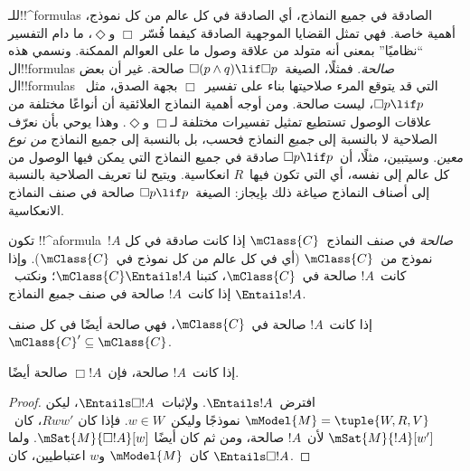 \documentclass[../../../include/open-logic-section]{subfiles}
\begin{document}


\begin{explain}
  للـ!!^{formula}s الصادقة في جميع النماذج، أي الصادقة في كل عالم من
  كل نموذج، أهمية خاصة. فهي تمثل القضايا الموجهية الصادقة كيفما فُسّر
  $\Box$ و$\Diamond$، ما دام التفسير ``نظاميًا'' بمعنى أنه متولد من
  علاقة وصول ما على العوالم الممكنة. ونسمي هذه ال!!{formula}s
  \emph{صالحة}. فمثلًا، الصيغة~$\Box(p \land q) \lif \Box p$ صالحة.
  غير أن بعض ال!!{formula}s التي قد يتوقع المرء صلاحيتها بناء على
  تفسير~$\Box$ بجهة الصدق، مثل~$\Box p \lif p$، ليست صالحة. ومن أوجه
  أهمية النماذج العلائقية أن أنواعًا مختلفة من علاقات الوصول تستطيع
  تمثيل تفسيرات مختلفة لـ$\Box$ و$\Diamond$. وهذا يوحي بأن نعرّف
  الصلاحية لا بالنسبة إلى 
  \emph{جميع} النماذج فحسب، بل بالنسبة إلى جميع النماذج
  \emph{من نوع معين}. وسيتبين، مثلًا، أن~$\Box p \lif p$ صادقة في
  جميع النماذج التي يمكن فيها الوصول من كل عالم إلى نفسه، أي التي
  تكون فيها~$R$ انعكاسية. ويتيح لنا تعريف الصلاحية بالنسبة إلى أصناف
  النماذج صياغة ذلك بإيجاز: الصيغة~$\Box p \lif p$ صالحة في صنف
  النماذج الانعكاسية.
\end{explain}

\begin{defn}
  تكون !!^a{formula}~$!A$ \emph{صالحة} في صنف النماذج~$\mClass{C}$
  إذا كانت صادقة في كل نموذج من~$\mClass{C}$ (أي في كل عالم من كل
  نموذج في~$\mClass{C}$). وإذا كانت~$!A$ صالحة في~$\mClass{C}$، كتبنا
  $\mClass{C} \Entails !A$؛ ونكتب~$\Entails !A$ إذا كانت~$!A$ صالحة
  في صنف \emph{جميع} النماذج.
\end{defn}

\begin{prop}
  إذا كانت~$!A$ صالحة في~$\mClass{C}$، فهي صالحة أيضًا في كل صنف
  $\mClass{C}' \subseteq \mClass{C}$.
\end{prop}

\begin{prop}
  إذا كانت~$!A$ صالحة، فإن~$\Box!A$ صالحة أيضًا.
\end{prop}

\begin{proof}
  افترض~$\Entails !A$. ولإثبات~$\Entails \Box!A$، ليكن
  $\mModel{M} = \tuple{W, R, V}$ نموذجًا وليكن~$w \in W$. فإذا كان
  $Rww'$، كان~$\mSat{M}{!A}[w']$ لأن~$!A$ صالحة، ومن ثم كان أيضًا
  $\mSat{M}{\Box!A}[w]$. ولما كان~$\mModel{M}$ و$w$ اعتباطيين، كان
  $\Entails \Box!A$.
\end{proof}
\end{document}
